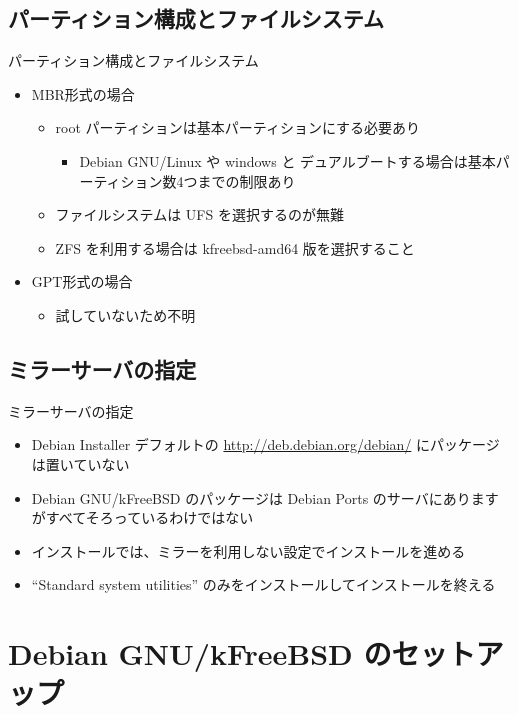 \subsection{パーティション構成とファイルシステム}
\begin{frame}{パーティション構成とファイルシステム}
  \begin{itemize}
  \item MBR形式の場合
    \begin{itemize}
    \item root パーティションは基本パーティションにする必要あり
      \begin{itemize}
      \item Debian GNU/Linux や windows と デュアルブートする場合は基本パーティション数4つまでの制限あり
      \end{itemize}
    \item ファイルシステムは UFS を選択するのが無難
    \item ZFS を利用する場合は kfreebsd-amd64 版を選択すること
    \end{itemize}
  \item GPT形式の場合
    \begin{itemize}
    \item 試していないため不明
    \end{itemize}
  \end{itemize}
\end{frame}

\subsection{ミラーサーバの指定}
\begin{frame}{ミラーサーバの指定}
  \begin{itemize}
  \item Debian Installer デフォルトの \url{http://deb.debian.org/debian/} にパッケージは置いていない
  \item Debian GNU/kFreeBSD のパッケージは Debian Ports のサーバにありますがすべてそろっているわけではない
  \item インストールでは、ミラーを利用しない設定でインストールを進める
  \item ``Standard system utilities'' のみをインストールしてインストールを終える
  \end{itemize}
\end{frame}


\section{Debian GNU/kFreeBSD のセットアップ}

